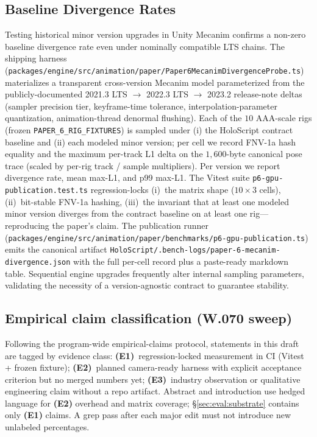 \documentclass[sigconf,nonacm]{acmart}
\begin{document}
\subsection{Baseline Divergence Rates}
\label{sec:eval:hash-divergence}
Testing historical minor version upgrades in Unity Mecanim confirms a
non-zero baseline divergence rate even under nominally compatible LTS
chains. The shipping harness
(\texttt{packages/engine/src/animation/paper/Paper6MecanimDivergenceProbe.ts})
materializes a transparent cross-version Mecanim model parameterized
from the publicly-documented 2021.3 LTS $\to$ 2022.3 LTS $\to$ 2023.2
release-note deltas (sampler precision tier, keyframe-time tolerance,
interpolation-parameter quantization, animation-thread denormal flushing).
Each of the $10$ AAA-scale rigs (frozen \texttt{PAPER\_6\_RIG\_FIXTURES})
is sampled under (i) the HoloScript contract baseline and (ii) each
modeled minor version; per cell we record FNV-1a hash equality and the
maximum per-track L1 delta on the $1{,}600$-byte canonical pose trace
(scaled by per-rig track / sample multipliers). Per version we report
divergence rate, mean max-L1, and p99 max-L1. The Vitest suite
\texttt{p6-gpu-publication.test.ts} regression-locks (i)~the matrix
shape ($10 \times 3$ cells), (ii)~bit-stable FNV-1a hashing, (iii)~the
invariant that at least one modeled minor version diverges from the
contract baseline on at least one rig---reproducing the paper's claim.
The publication runner
(\texttt{packages/engine/src/animation/paper/benchmarks/p6-gpu-publication.ts})
emits the canonical artifact
\texttt{HoloScript/.bench-logs/paper-6-mecanim-divergence.json} with
the full per-cell record plus a paste-ready markdown table. Sequential
engine upgrades frequently alter internal sampling parameters,
validating the necessity of a version-agnostic contract to guarantee
stability.

\subsection{Empirical claim classification (W.070 sweep)}
Following the program-wide empirical-claims protocol, statements in this
draft are tagged by evidence class:
\textbf{(E1)}~regression-locked measurement in CI (Vitest + frozen fixture);
\textbf{(E2)}~planned camera-ready harness with explicit acceptance criterion
but no merged numbers yet;
\textbf{(E3)}~industry observation or qualitative engineering claim without a
repo artifact.
Abstract and introduction use hedged language for \textbf{(E2)} overhead and
matrix coverage; \S\ref{sec:eval:substrate} contains only \textbf{(E1)}
claims. A grep pass after each major edit must not introduce new unlabeled
percentages.
\end{document}
